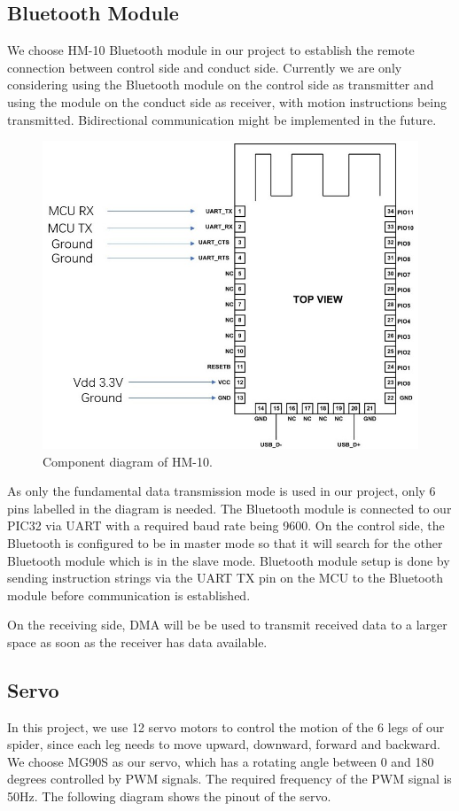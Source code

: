 \documentclass[a4paper]{article}
\begin{document}
\subsection{Bluetooth Module}
We choose HM-10 Bluetooth module in our project to establish the remote connection between control side and conduct side. Currently we are only considering using the Bluetooth module on the control side as transmitter and using the module on the conduct side as receiver, with motion instructions being transmitted. Bidirectional communication might be implemented in the future.
\begin{figure}[H]
    \centering
    \includegraphics[width=1\textwidth]{HM10.jpg}
    \caption{Component diagram of HM-10.}
\end{figure}
As only the fundamental data transmission mode is used in our project, only 6 pins labelled in the diagram is needed. The Bluetooth module is connected to our PIC32 via UART with a required baud rate being 9600. On the control side, the Bluetooth is configured to be in master mode so that it will search for the other Bluetooth module which is in the slave mode. Bluetooth module setup is done by sending instruction strings via the UART TX pin on the MCU to the Bluetooth module before communication is established.

On the receiving side, DMA will be be used to transmit received data to a larger space as soon as the receiver has data available.

\subsection{Servo}
In this project, we use 12 servo motors to control the motion of the 6 legs of our spider, since each leg needs to move upward, downward, forward and backward. We choose MG90S as our servo, which has a rotating angle between 0 and 180 degrees controlled by PWM signals. The required frequency of the PWM signal is 50Hz. The following diagram shows the pinout of the servo.
\end{document}
